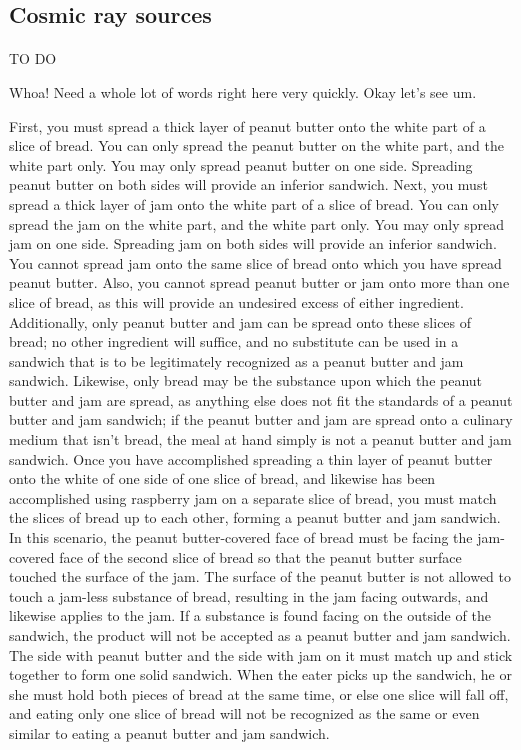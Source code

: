 \documentclass[a4paper, titlepage, oneside]{article}
\begin{document}
\begin{multicols}{2}
\subsection{Cosmic ray sources}
\paragraph{}
TO DO

Whoa! Need a whole lot of words right here very quickly. Okay let's see um.

First, you must spread a thick layer of peanut butter onto the white part of a slice of bread. You can only spread the peanut butter on the white part, and the white part only. You may only spread peanut butter on one side. Spreading peanut butter on both sides will provide an inferior sandwich. Next, you must spread a thick layer of jam onto the white part of a slice of bread. You can only spread the jam on the white part, and the white part only. You may only spread jam on one side. Spreading jam on both sides will provide an inferior sandwich. You cannot spread jam onto the same slice of bread onto which you have spread peanut butter. Also, you cannot spread peanut butter or jam onto more than one slice of bread, as this will provide an undesired excess of either ingredient. Additionally, only peanut butter and jam can be spread onto these slices of bread; no other ingredient will suffice, and no substitute can be used in a sandwich that is to be legitimately recognized as a peanut butter and jam sandwich. Likewise, only bread may be the substance upon which the peanut butter and jam are spread, as anything else does not fit the standards of a peanut butter and jam sandwich; if the peanut butter and jam are spread onto a culinary medium that isn’t bread, the meal at hand simply is not a peanut butter and jam sandwich. Once you have accomplished spreading a thin layer of peanut butter onto the white of one side of one slice of bread, and likewise has been accomplished using raspberry jam on a separate slice of bread, you must match the slices of bread up to each other, forming a peanut butter and jam sandwich. In this scenario, the peanut butter-covered face of bread must be facing the jam-covered face of the second slice of bread so that the peanut butter surface touched the surface of the jam. The surface of the peanut butter is not allowed to touch a jam-less substance of bread, resulting in the jam facing outwards, and likewise applies to the jam. If a substance is found facing on the outside of the sandwich, the product will not be accepted as a peanut butter and jam sandwich. The side with peanut butter and the side with jam on it must match up and stick together to form one solid sandwich. When the eater picks up the sandwich, he or she must hold both pieces of bread at the same time, or else one slice will fall off, and eating only one slice of bread will not be recognized as the same or even similar to eating a peanut butter and jam sandwich.


\end{multicols}
\end{document}
